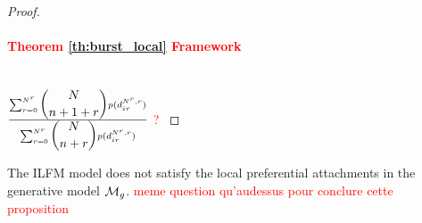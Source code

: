 \begin{proof}
    \paragraph{\textcolor{red}{Theorem \ref{th:burst_local} Framework }}~\\

    $\frac{\sum_{r=0}^{N^r}\dbinom{N}{n+1+r} p(d_{ir}^{N^r,r})}{\sum_{r=0}^{N^r} \dbinom{N}{n+r} p(d_{ir}^{N^r,r})}$  \textcolor{red}{ ? }

\end{proof}

\begin{proposition}
    The ILFM model does not satisfy the local preferential attachments in the generative model $\mathcal{M}_g$. \textcolor{red}{ meme question qu'audessus pour conclure cette proposition}
\end{proposition}

